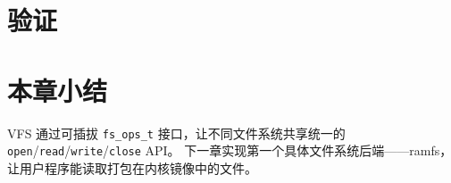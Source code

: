 
\section{验证}
\label{sec:vfs-verify}


\section{本章小结}

VFS 通过可插拔 \texttt{fs\_ops\_t} 接口，让不同文件系统共享统一的
\texttt{open}/\texttt{read}/\texttt{write}/\texttt{close} API。
下一章实现第一个具体文件系统后端——ramfs，让用户程序能读取打包在内核镜像中的文件。
